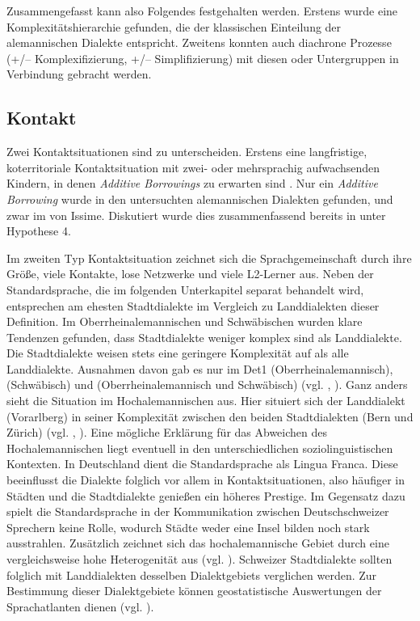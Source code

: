 Zusammengefasst kann also Folgendes festgehalten werden. Erstens wurde eine Komplexitätshierarchie gefunden, die der klassischen Einteilung der alemannischen Dialekte entspricht. Zweitens konnten auch diachrone Prozesse (+/– Komplexifizierung, +/– Simplifizierung) mit diesen  oder Untergruppen in Verbindung gebracht werden.

\subsection{Kontakt}\label{6.6.3}

Zwei Kontaktsituationen sind zu unterscheiden. Erstens eine langfristige, koterritoriale Kontaktsituation mit zwei- oder mehrsprachig aufwachsenden Kindern, in denen \textit{Additive Borrowings} zu erwarten sind \citep[34]{Trudgill2011}. Nur ein \textit{Additive Borrowing} wurde in den untersuchten alemannischen Dialekten gefunden, und zwar im  von Issime. Diskutiert wurde dies zusammenfassend bereits in  unter Hypothese 4.

Im zweiten Typ Kontaktsituation zeichnet sich die Sprachgemeinschaft durch ihre Größe, viele Kontakte, lose Netzwerke und viele L2-Ler\-ner aus. Neben der Standardsprache, die im folgenden Unterkapitel separat behandelt wird, entsprechen am ehesten Stadtdialekte im Vergleich zu Landdialekten dieser Definition. Im Oberrheinalemannischen und Schwäbischen wurden klare Tendenzen gefunden, dass Stadtdialekte weniger komplex sind als Landdialekte. Die Stadtdialekte weisen stets eine geringere Komplexität auf als alle Landdialekte. Ausnahmen davon gab es nur im Det1 (Oberrheinalemannisch),  (Schwäbisch) und  (Oberrheinalemannisch und Schwäbisch) (vgl. , ). Ganz anders sieht die Situation im Hochalemannischen aus. Hier situiert sich der Landdialekt (Vorarlberg) in seiner Komplexität zwischen den beiden Stadtdialekten (Bern und Zürich) (vgl. , ). Eine mögliche Erklärung für das Abweichen des Hochalemannischen liegt eventuell in den unterschiedlichen soziolinguistischen Kontexten. In Deutschland dient die Standardsprache als Lingua Franca. Diese beeinflusst die Dialekte folglich vor allem in Kontaktsituationen, also häufiger in Städten und die Stadtdialekte genießen ein höheres Prestige. Im Gegensatz dazu spielt die Standardsprache in der Kommunikation zwischen Deutschschweizer Sprechern keine Rolle, wodurch Städte weder eine Insel bilden noch stark ausstrahlen. Zusätzlich zeichnet sich das hochalemannische Gebiet durch eine vergleichsweise hohe Heterogenität aus (vgl. \citealt{PröllStöcklevorb}). Schweizer Stadtdialekte sollten folglich mit Landdialekten desselben Dialektgebiets verglichen werden. Zur Bestimmung dieser Dialektgebiete können geostatistische Auswertungen der Sprachatlanten dienen (vgl. ).

